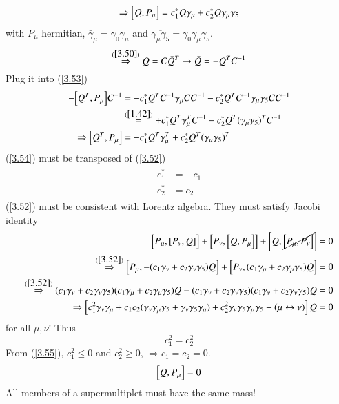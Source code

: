 \begin{equation}
   \Rightarrow \comm{\bar{Q}}{P_\mu} = c_1^* \bar Q \gamma_\mu + c_2^* \bar Q \gamma_\mu \gamma_5 \label{3.53}
\end{equation}
with $P_\mu$ hermitian, $\bar\gamma_\mu = \gamma_0 \gamma_\mu$ and $\overline{\gamma_\mu \gamma_5} =\gamma_0 \gamma_\mu \gamma_5$.
\begin{equation*}
   \stackrel{(\ref{3.50})}{\Rightarrow} Q = C \bar Q^T \rightarrow \bar Q = - Q^T C^{-1}
\end{equation*}
Plug it into (\ref{3.53})
\begin{align}
   - \comm{Q^T}{P_\mu} C^{-1} &= -c_1^* Q^T C^{-1} \gamma_\mu C C^{-1} - c_2^* Q^T C^{-1} \gamma_\mu \gamma_5 C C^{-1} \notag \\
                              & \stackrel{(\ref{1.42})}{=} + c_1^* Q^T \gamma_\mu^T C^{-1} - c_2^* Q^{T} (\gamma_\mu \gamma_5)^T C^{-1} \notag \\
   \Rightarrow \comm{Q^T}{P_\mu} &= -c_1^* Q^T \gamma_\mu^T + c_2^* Q^T (\gamma_\mu \gamma_5)^T \label{3.54}
\end{align}
(\ref{3.54}) must be transposed of (\ref{3.52})
\begin{align}
   \begin{split}
      c_1^* &= - c_1 \\
      c_2^* &= c_2
   \end{split}\label{3.55}
\end{align}
(\ref{3.52}) must be consistent with Lorentz algebra. They must satisfy Jacobi identity 
\begin{align*}
   \comm{P_\mu}{\comm{P_\nu}{Q}} + \comm{P_\nu}{\comm{Q}{P_\mu}} + \comm{Q}{\cancel{\comm{P_\mu}{P_\nu}}} = 0 \\
   \stackrel{(\ref{3.52})}{\Rightarrow}\comm{P_\mu}{-(c_1 \gamma_\nu + c_2 \gamma_\nu \gamma_5)Q} + \comm{P_\nu}{(c_1 \gamma_\mu + c_2 \gamma_\mu \gamma_5 )Q} = 0 \\
   \stackrel{(\ref{3.52})}{\Rightarrow} (c_1 \gamma_\nu + c_2 \gamma_\nu \gamma_5)(c_1 \gamma_\mu + c_2 \gamma_\mu \gamma_5) Q  - (c_1 \gamma_\nu + c_2 \gamma_\nu \gamma_5)(c_1 \gamma_\nu + c_2\gamma_\nu \gamma_5) Q = 0 \\
   \Rightarrow \left[ c_1^2 \gamma_\nu \gamma_\mu + c_1 c_2 (\gamma_\nu \gamma_\mu \gamma_5 + \gamma_\nu \gamma_5 \gamma_\mu) + c_2^2 \gamma_\nu \gamma_5 \gamma_\mu \gamma_5 - (\mu\leftrightarrow \nu) \right] Q = 0
\end{align*}
for all $\mu,\nu$! Thus
\begin{equation}
   c_1^2 = c_2^2 \label{3.56}
\end{equation}
From (\ref{3.55}), $c_1^2 \leq 0$ and $c_2^2 \geq 0$, $\Rightarrow c_1 = c_2 = 0$.
\begin{equation}
   \comm{Q}{P_\mu} = 0
   \label{3.57}
\end{equation}
All members of a supermultiplet must have the same mass!

